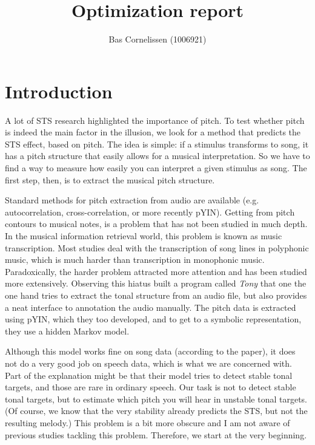\documentclass[a4paper,9pt]{article}
\title{\textbf{Optimization report}}
\author{Bas Cornelissen (1006921)}
\begin{document}
\maketitle

\section{Introduction}
A lot of STS research highlighted the importance of pitch. To test whether pitch is indeed the main factor in the illusion, we look for a method that predicts the STS effect, based on pitch. The idea is simple: if a stimulus transforms to song, it has a pitch structure that easily allows for a musical interpretation. So we have to find a way to measure how easily you can interpret a given stimulus as song. The first step, then, is to extract the musical pitch structure. 

Standard methods for pitch extraction from audio are available (e.g. autocorrelation, cross-correlation, or more recently pYIN). Getting from pitch contours to musical notes, is a problem that has not been studied in much depth. In the musical information retrieval world, this problem is known as music transcription. Most studies deal with the transcription of song lines in polyphonic music, which is much harder than transcription in monophonic music. Paradoxically, the harder problem attracted more attention and has been studied more extensively. Observing this hiatus \citeauthor{Mauch2015c} built a program called \emph{Tony} that one the one hand tries to extract the tonal structure from an audio file, but also provides a neat interface to annotation the audio manually. The pitch data is extracted using pYIN, which they too developed, and to get to a symbolic representation, they use a hidden Markov model. 

Although this model works fine on song data (according to the paper), it does not do a very good job on speech data, which is what we are concerned with. Part of the explanation might be that their model tries to detect stable tonal targets, and those are rare in ordinary speech. Our task is not to detect stable tonal targets, but to estimate which pitch you will hear in unstable tonal targets. (Of course, we know that the very stability already predicts the STS, but not the resulting melody.) This problem is a bit more obscure and I am not aware of previous studies tackling this problem. Therefore, we start at the very beginning.
\end{document}
